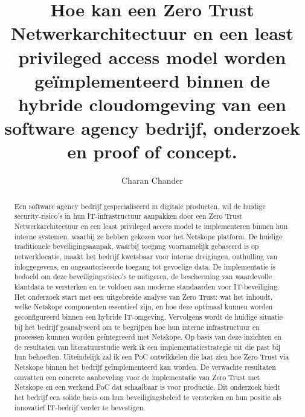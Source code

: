 \documentclass{hogent-article}
\title{Hoe kan een Zero Trust Netwerkarchitectuur en een least privileged access model worden geïmplementeerd binnen de hybride cloudomgeving van een software agency bedrijf, onderzoek en proof of concept.}
\author{Charan Chander}
\begin{document}
\begin{abstract}
  Een software agency bedrijf gespecialiseerd in digitale producten, wil de huidige security-risico's in hun IT-infrastructuur aanpakken door een Zero Trust Netwerkarchitectuur en een least privileged access model te implementeren binnen hun interne systemen, waarbij ze hebben gekozen voor het Netskope platform. 
  De huidige traditionele beveiligingsaanpak, waarbij toegang voornamelijk gebaseerd is op netwerklocatie, maakt het bedrijf kwetsbaar voor interne dreigingen, onthulling van inloggegevens, en ongeautoriseerde toegang tot gevoelige data. 
  De implementatie is bedoeld om deze beveiligingsrisico's te mitigeren, de bescherming van waardevolle klantdata te versterken en te voldoen aan moderne standaarden voor IT-beveiliging.
  Het onderzoek start met een uitgebreide analyse van Zero Trust: wat het inhoudt, welke Netskope componenten essentieel zijn, en hoe deze optimaal kunnen worden geconfigureerd binnen een hybride IT-omgeving. 
  Vervolgens wordt de huidige situatie bij het bedrijf geanalyseerd om te begrijpen hoe hun interne infrastructuur en processen kunnen worden geïntegreerd met Netskope. 
  Op basis van deze inzichten en de resultaten van literatuurstudie werk ik een implementatiestrategie uit die past bij hun behoeften. 
  Uiteindelijk zal ik een PoC ontwikkelen die laat zien hoe Zero Trust via Netskope binnen het bedrijf geïmplementeerd kan worden.
  De verwachte resultaten omvatten een concrete aanbeveling voor de implementatie van Zero Trust met Netskope en een werkend PoC dat schaalbaar is voor productie. Dit onderzoek biedt het bedrijf een solide basis om hun beveiligingsbeleid te versterken en hun positie als innovatief IT-bedrijf verder te bevestigen.
\end{abstract}

\tableofcontents



\printbibliography[heading=bibintoc]
\end{document}
